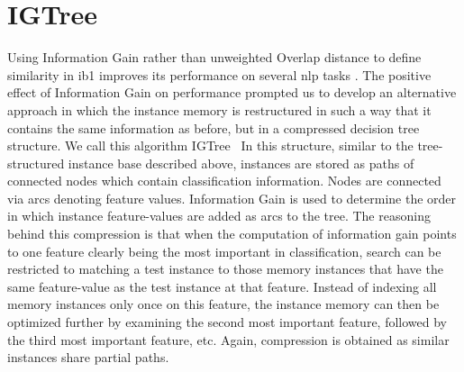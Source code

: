\documentclass{book}
\begin{document}
\section{IGTree}
\label{igtree}

Using Information Gain rather than unweighted Overlap distance to
define similarity in {\sc ib1} improves its performance on several
{\sc nlp} tasks \cite{Daelemans+92b,VandenBosch+93,VandenBosch97}.
The positive effect of Information Gain on performance prompted us to
develop an alternative approach in which the instance memory is
restructured in such a way that it contains the same information as
before, but in a compressed decision tree structure. We call this
algorithm {\sc IGTree}~\cite{Daelemans+97}
In this structure, similar to the
tree-structured instance base described above, instances are stored as
paths of connected nodes which contain classification
information. Nodes are connected via arcs denoting feature
values. Information Gain is used to determine the order in which
instance feature-values are added as arcs to the tree. The reasoning
behind this compression is that when the computation of information
gain points to one feature clearly being the most important in
classification, search can be restricted to matching a test instance
to those memory instances that have the same feature-value as the test
instance at that feature. Instead of indexing all memory instances
only once on this feature, the instance memory can then be optimized
further by examining the second most important feature, followed by
the third most important feature, etc.  Again, compression is obtained
as similar instances share partial paths.

\end{document}
